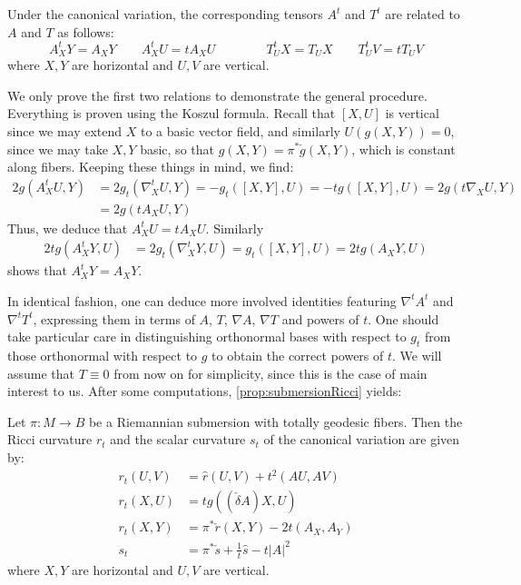 \begin{lem}
	Under the canonical variation, the corresponding tensors $A^t$ and $T^t$ are related to $A$ and $T$ as follows:
	\begin{equation*}
		A^t_X Y=A_X Y\qquad A^t_X U=t A_X U\qquad \qquad T^t_U X=T_U X \qquad T^t_U V=tT_U V
	\end{equation*}
	where $X,Y$ are horizontal and $U,V$ are vertical.
\end{lem}
\begin{myproof}
	We only prove the first two relations to demonstrate the general procedure. Everything is proven using the Koszul formula. Recall that $[X,U]$ is vertical since we may extend $X$ to a basic vector field, and similarly $U(g(X,Y))=0$, since we may take $X,Y$ basic, so that $g(X,Y)=\pi^*\check g(X,Y)$, which is constant along fibers. Keeping these things in mind, we find:
	\begin{align*}
		2g(A^t_X U,Y)&=2g_t(\nabla^t_X U,Y)=-g_t([X,Y],U)=-tg([X,Y],U)=2g(t\nabla_X U,Y)\\
		&=2g(t A_X U,Y)
	\end{align*}
	Thus, we deduce that $A^t_XU=tA_XU$. Similarly
	\begin{align*}
		2tg(A^t_X Y,U)&=2g_t(\nabla^t_X Y,U)=g_t([X,Y],U)=2tg(A_X Y,U)
	\end{align*}
	shows that $A^t_X Y=A_X Y$.
\end{myproof}

In identical fashion, one can deduce more involved identities featuring $\nabla^t A^t$ and $\nabla^t T^t$, expressing them in terms of $A$, $T$, $\nabla A$, $\nabla T$ and powers of $t$. One should take particular care in distinguishing orthonormal bases with respect to $g_t$ from those orthonormal with respect to $g$ to obtain the correct powers of $t$. We will assume that $T\equiv 0$ from now on for simplicity, since this is the case of main interest to us. After some computations, \cref{prop:submersionRicci} yields:

\begin{prop}\label{prop:variationcurvature}
	Let $\pi:M\to B$ be a Riemannian submersion with totally geodesic fibers. Then the Ricci curvature $r_t$ and the scalar curvature $s_t$ of the canonical variation are given by:
	\begin{align*}
		r_t(U,V)&=\hat r(U,V)+t^2(AU,AV)\\
		r_t(X,U)&=tg((\check\delta A)X, U)\\
		r_t(X,Y)&=\pi^*\check r(X,Y)-2t(A_X,A_Y)\\
		s_t&=\pi^*\check s+\frac{1}{t}\hat s-t\lvert A\rvert^2
	\end{align*}
	where $X,Y$ are horizontal and $U,V$ are vertical.\proofclear
\end{prop}

